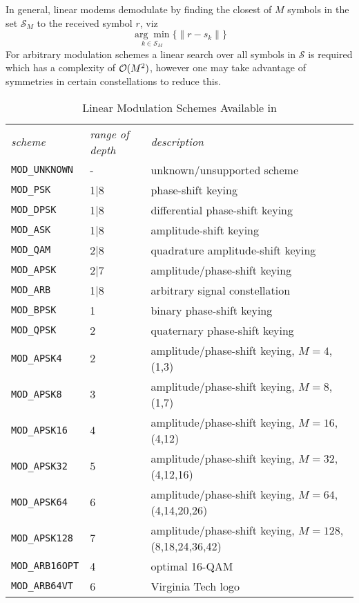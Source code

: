 In general, linear modems demodulate by finding the closest of $M$
symbols in the set $\mathcal{S}_M$ to the received symbol $r$, viz
%
\begin{equation}
\label{eqn:modem:demod}
    \underset{k \in \mathcal{S}_M}{\arg\min}
    \bigl\{
        \| r - s_k \|
    \bigr\}
\end{equation}
%
For arbitrary modulation schemes a linear search over all symbols in
$\mathcal{S}$ is required which has a complexity of $\mathcal{O}(M^2)$, however one may
take advantage of symmetries in certain constellations to reduce this.

\begin{table*}
\caption{Linear Modulation Schemes Available in \liquid}
\label{tab:modem:schemes}
\centering
{\small
\begin{tabular*}{0.95\textwidth}{l@{\extracolsep{\fill}}ll}
\toprule
{\it scheme} &
{\it range of depth} &
{\it description}\\\otoprule
%
{\tt MOD\_UNKNOWN}      & -     & unknown/unsupported scheme\\
{\tt MOD\_PSK}          & 1|8   & phase-shift keying\\
{\tt MOD\_DPSK}         & 1|8   & differential phase-shift keying\\
{\tt MOD\_ASK}          & 1|8   & amplitude-shift keying\\
{\tt MOD\_QAM}          & 2|8   & quadrature amplitude-shift keying\\
{\tt MOD\_APSK}         & 2|7   & amplitude/phase-shift keying\\
{\tt MOD\_ARB}          & 1|8   & arbitrary signal constellation\\\midrule
%
{\tt MOD\_BPSK}         & 1     & binary phase-shift keying\\
{\tt MOD\_QPSK}         & 2     & quaternary phase-shift keying\\
{\tt MOD\_APSK4}        & 2     & amplitude/phase-shift keying, $M=4$, (1,3)\\
{\tt MOD\_APSK8}        & 3     & amplitude/phase-shift keying, $M=8$, (1,7)\\
{\tt MOD\_APSK16}       & 4     & amplitude/phase-shift keying, $M=16$, (4,12)\\
{\tt MOD\_APSK32}       & 5     & amplitude/phase-shift keying, $M=32$, (4,12,16)\\
{\tt MOD\_APSK64}       & 6     & amplitude/phase-shift keying, $M=64$, (4,14,20,26)\\
{\tt MOD\_APSK128}      & 7     & amplitude/phase-shift keying, $M=128$, (8,18,24,36,42)\\
{\tt MOD\_ARB16OPT}     & 4     & optimal 16-QAM\\
{\tt MOD\_ARB64VT}      & 6     & Virginia Tech logo\\\bottomrule
% 
\end{tabular*}
}
\end{table*}%


